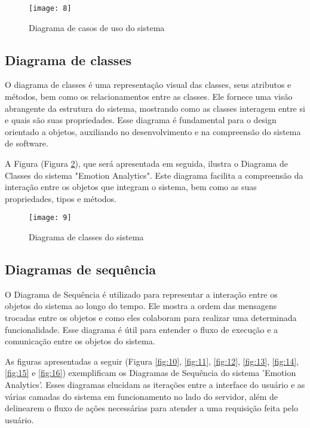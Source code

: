 \begin{figure}[h]
  \caption{Diagrama de casos de uso do sistema}
  \centering
  \texttt{[image: 8]}
  \label{fig:8}
\end{figure}
\FloatBarrier

\clearpage
\subsection{Diagrama de classes}

O diagrama de classes \cite{27} é uma representação visual das classes, seus atributos e métodos, bem como os relacionamentos entre as classes. Ele fornece uma visão abrangente da estrutura do sistema, mostrando como as classes interagem entre si e quais são suas propriedades. Esse diagrama é fundamental para o design orientado a objetos, auxiliando no desenvolvimento e na compreensão do sistema de software.

A Figura (Figura \ref{fig:9}), que será apresentada em seguida, ilustra o Diagrama de Classes do sistema "Emotion Analytics". Este diagrama facilita a compreensão da interação entre os objetos que integram o sistema, bem como as suas propriedades, tipos e métodos.

\begin{figure}[h]
  \caption{Diagrama de classes do sistema}
  \centering
  \texttt{[image: 9]}
  \label{fig:9}
\end{figure}
\FloatBarrier

\clearpage
\subsection{Diagramas de sequência}

O Diagrama de Sequência \cite{28} é utilizado para representar a interação entre os objetos do sistema ao longo do tempo. Ele mostra a ordem das mensagens trocadas entre os objetos e como eles colaboram para realizar uma determinada funcionalidade. Esse diagrama é útil para entender o fluxo de execução e a comunicação entre os objetos do sistema.

As figuras apresentadas a seguir (Figura \ref{fig:10}, \ref{fig:11}, \ref{fig:12}, \ref{fig:13}, \ref{fig:14}, \ref{fig:15} e \ref{fig:16}) exemplificam os Diagramas de Sequência do sistema 'Emotion Analytics'. Esses diagramas elucidam as iterações entre a interface do usuário e as várias camadas do sistema em funcionamento no lado do servidor, além de delinearem o fluxo de ações necessárias para atender a uma requisição feita pelo usuário.

